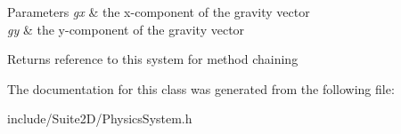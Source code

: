 \begin{DoxyParams}{Parameters}
{\em gx} & the x-\/component of the gravity vector \\
\hline
{\em gy} & the y-\/component of the gravity vector \\
\hline
\end{DoxyParams}
\begin{DoxyReturn}{Returns}
reference to this system for method chaining 
\end{DoxyReturn}


The documentation for this class was generated from the following file\+:\begin{DoxyCompactItemize}
\item 
include/\+Suite2\+D/Physics\+System.\+h\end{DoxyCompactItemize}
